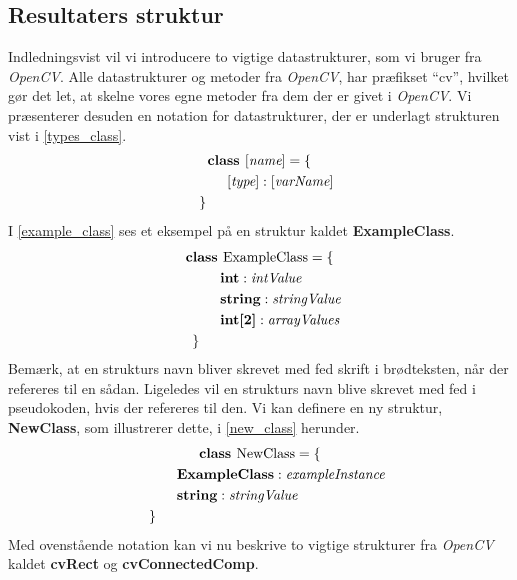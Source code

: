{\subsection{Resultaters struktur\label{resultat_struktur}}
Indledningsvist vil vi introducere to vigtige datastrukturer, som vi
bruger fra \emph{OpenCV}. Alle datastrukturer og metoder fra
\emph{OpenCV}, har præfikset ``cv'', hvilket gør det let, at skelne
vores egne metoder fra dem der er givet i \emph{OpenCV}. Vi præsenterer
desuden en notation for datastrukturer, der er underlagt strukturen vist
i \eqref{types_class}.
\begin{multline}
    \textbf{class~} [\textit{name}] = \{ \\
    \shoveleft{\qquad[\textit{type}] : [\textit{varName}]} \\
    \shoveleft{\}}\shoveright{}
    \label{types_class}
\end{multline}
I \eqref{example_class} ses et eksempel på en struktur kaldet
\textbf{ExampleClass}.
\begin{multline}
    \textbf{class~} \textrm{ExampleClass} = \{ \\
    \shoveleft{\qquad\textbf{int} : \textit{intValue}} \\
    \shoveleft{\qquad\textbf{string} : \textit{stringValue}} \\
    \shoveleft{\qquad\textbf{int[2]} : \textit{arrayValues}} \\
    \shoveleft{\}}\shoveright{}
    \label{example_class}
\end{multline}
Bemærk, at en strukturs navn bliver skrevet med fed skrift i
brødteksten, når der refereres til en sådan. Ligeledes vil en strukturs
navn blive skrevet med fed i pseudokoden, hvis der refereres til den. Vi
kan definere en ny struktur, \textbf{NewClass}, som illustrerer dette, i
\eqref{new_class} herunder.
\begin{multline}
    \textbf{class~} \textrm{NewClass} = \{ \\
    \shoveleft{\qquad\textbf{ExampleClass} : \textit{exampleInstance}} \\
    \shoveleft{\qquad\textbf{string} : \textit{stringValue}} \\
    \shoveleft{\}}\shoveright{}
    \label{new_class}
\end{multline}
Med ovenstående notation kan vi nu beskrive to vigtige strukturer fra
\emph{OpenCV} kaldet \textbf{cvRect} og \textbf{cvConnectedComp}.

}
